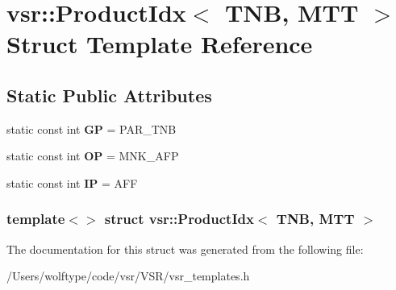 \hypertarget{structvsr_1_1_product_idx_3_01_t_n_b_00_01_m_t_t_01_4}{\section{vsr\-:\-:Product\-Idx$<$ T\-N\-B, M\-T\-T $>$ Struct Template Reference}
\label{structvsr_1_1_product_idx_3_01_t_n_b_00_01_m_t_t_01_4}
}
\subsection*{Static Public Attributes}
\begin{DoxyCompactItemize}
\item 
\hypertarget{structvsr_1_1_product_idx_3_01_t_n_b_00_01_m_t_t_01_4_adea170d38fe3c2dbe27b4961b39df3b8}{static const int {\bfseries G\-P} = P\-A\-R\-\_\-\-T\-N\-B}\label{structvsr_1_1_product_idx_3_01_t_n_b_00_01_m_t_t_01_4_adea170d38fe3c2dbe27b4961b39df3b8}

\item 
\hypertarget{structvsr_1_1_product_idx_3_01_t_n_b_00_01_m_t_t_01_4_a19c0c32b91f94c40ab7138ddbf869ab3}{static const int {\bfseries O\-P} = M\-N\-K\-\_\-\-A\-F\-P}\label{structvsr_1_1_product_idx_3_01_t_n_b_00_01_m_t_t_01_4_a19c0c32b91f94c40ab7138ddbf869ab3}

\item 
\hypertarget{structvsr_1_1_product_idx_3_01_t_n_b_00_01_m_t_t_01_4_a30719b9ed6be4a2730c0ef27ada4c74c}{static const int {\bfseries I\-P} = A\-F\-F}\label{structvsr_1_1_product_idx_3_01_t_n_b_00_01_m_t_t_01_4_a30719b9ed6be4a2730c0ef27ada4c74c}

\end{DoxyCompactItemize}
\subsubsection*{template$<$$>$ struct vsr\-::\-Product\-Idx$<$ T\-N\-B, M\-T\-T $>$}



The documentation for this struct was generated from the following file\-:\begin{DoxyCompactItemize}
\item 
/\-Users/wolftype/code/vsr/\-V\-S\-R/vsr\-\_\-templates.\-h\end{DoxyCompactItemize}
